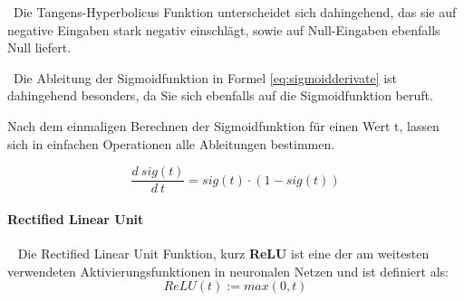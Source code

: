 ~\newline Die Tangens-Hyperbolicus Funktion unterscheidet sich dahingehend, das sie auf negative Eingaben stark negativ einschlägt, sowie auf Null-Eingaben ebenfalls Null liefert. 

~\newline Die Ableitung der Sigmoidfunktion in Formel \ref{eq:sigmoidderivate} ist dahingehend besonders, da Sie sich ebenfalls auf die Sigmoidfunktion beruft. 

Nach dem einmaligen Berechnen der Sigmoidfunktion für einen Wert t, lassen sich in einfachen Operationen alle Ableitungen bestimmen. 

\begin{equation}
	\label{eq:sigmoidderivate}
	\dfrac{d \ sig(t)}{d \ t} = sig(t) \cdot (1 - sig(t))
\end{equation}  
\paragraph{Rectified Linear Unit}~\newline
Die Rectified Linear Unit Funktion, kurz \textbf{ReLU} ist eine der am weitesten verwendeten Aktivierungsfunktionen in neuronalen Netzen und ist definiert als: 
\begin{equation}
\label{eq:ReLU}
ReLU(t) := max(0,t)
\end{equation}


